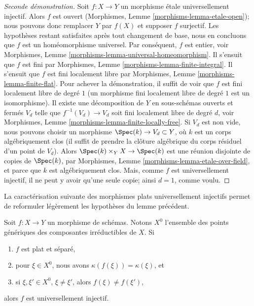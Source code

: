 \begin{proof}[Seconde démonstration]
Soit $f : X \to Y$ un morphisme \'etale universellement injectif.
Alors $f$ est ouvert (Morphismes, Lemme \ref{morphisms-lemma-etale-open});
nous pouvons donc remplacer $Y$ par $f(X)$ et supposer $f$ surjectif.
Les hypothèses restant satisfaites après tout changement de base, nous en
concluons que $f$ est un homéomorphisme universel. Par conséquent, $f$ est
entier, voir
Morphismes, Lemme \ref{morphisms-lemma-universal-homeomorphism}.
Il s'ensuit que $f$ est fini par
Morphismes, Lemme \ref{morphisms-lemma-finite-integral}.
Il s'ensuit que $f$ est fini localement libre par
Morphismes, Lemme \ref{morphisms-lemma-finite-flat}.
Pour achever la démonstration, il suffit de voir que $f$ est fini localement
libre de degré $1$ (un morphisme fini localement libre de degré $1$
est un isomorphisme).
Il existe une décomposition de $Y$ en sous-schémas ouverts et fermés
$V_d$ telle que $f^{-1}(V_d) \to V_d$ soit fini localement libre de
degré $d$, voir Morphismes, Lemme \ref{morphisms-lemma-finite-locally-free}.
Si $V_d$ est non vide, nous pouvons choisir un morphisme
$\Spec(k) \to V_d \subset Y$, où $k$ est un corps algébriquement clos
(il suffit de prendre la clôture algébrique du corps résiduel d'un point de
$V_d$).
Alors $\Spec(k) \times_Y X \to \Spec(k)$ est une réunion disjointe de
copies de $\Spec(k)$, par
Morphismes, Lemme \ref{morphisms-lemma-etale-over-field},
et parce que $k$ est algébriquement clos.
Mais, comme $f$ est universellement injectif, il ne peut y avoir qu'une seule
copie; ainsi $d = 1$, comme voulu.
\end{proof}

\noindent
La caractérisation suivante des morphismes plats universellement injectifs
permet de reformuler légèrement les hypothèses du lemme précédent.

\begin{lemma}
\label{lemma-flat-universally-injective}
Soit $f : X \to Y$ un morphisme de schémas. Notons $X^0$ l'ensemble
des points génériques des composantes irréductibles de $X$. Si
\begin{enumerate}
\item $f$ est plat et séparé,
\item pour $\xi \in X^0$, nous avons $\kappa(f(\xi)) = \kappa(\xi)$, et
\item si $\xi, \xi' \in X^0$, $\xi \not = \xi'$, alors
$f(\xi) \not = f(\xi')$,
\end{enumerate}
alors $f$ est universellement injectif.
\end{lemma}

